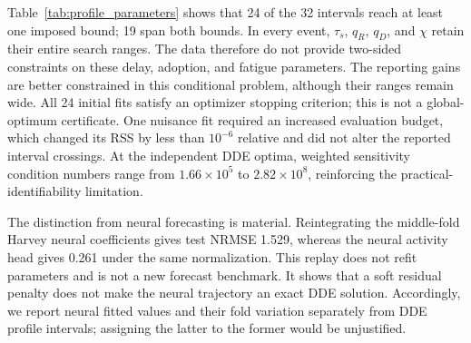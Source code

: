 Table~\ref{tab:profile_parameters} shows that 24 of the 32 intervals reach at least one imposed bound; 19 span both bounds. In every event, $\tau_s$, $q_R$, $q_D$, and $\chi$ retain their entire search ranges. The data therefore do not provide two-sided constraints on these delay, adoption, and fatigue parameters. The reporting gains are better constrained in this conditional problem, although their ranges remain wide. All 24 initial fits satisfy an optimizer stopping criterion; this is not a global-optimum certificate. One nuisance fit required an increased evaluation budget, which changed its RSS by less than $10^{-6}$ relative and did not alter the reported interval crossings. At the independent DDE optima, weighted sensitivity condition numbers range from $1.66\times10^5$ to $2.82\times10^8$, reinforcing the practical-identifiability limitation.

The distinction from neural forecasting is material. Reintegrating the middle-fold Harvey neural coefficients gives test NRMSE 1.529, whereas the neural activity head gives 0.261 under the same normalization. This replay does not refit parameters and is not a new forecast benchmark. It shows that a soft residual penalty does not make the neural trajectory an exact DDE solution. Accordingly, we report neural fitted values and their fold variation separately from DDE profile intervals; assigning the latter to the former would be unjustified.
